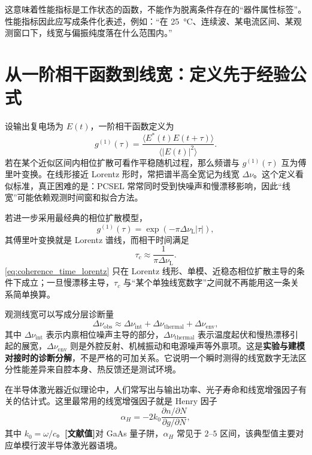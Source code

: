 这意味着性能指标是工作状态的函数，不能作为脱离条件存在的“器件属性标签”。性能指标因此应写成条件化表述，例如：“在 \SI{25}{\celsius}、连续波、某电流区间、某观测窗口下，线宽与偏振纯度落在什么范围内。”

\section{从一阶相干函数到线宽：定义先于经验公式}
设输出复电场为 $E(t)$，一阶相干函数定义为
\begin{equation}
 g^{(1)}(\tau)=\frac{\langle E^*(t)E(t+\tau)\rangle}{\langle |E(t)|^2\rangle}.
\end{equation}
若在某个近似区间内相位扩散可看作平稳随机过程，那么频谱与 $g^{(1)}(\tau)$ 互为傅里叶变换。在线形接近 Lorentz 形时，常把谱半高全宽记为线宽 $\Delta\nu$。这个定义看似标准，真正困难的是：PCSEL 常常同时受到快噪声和慢漂移影响，因此“线宽”可能依赖观测时间窗和拟合方法。

若进一步采用最经典的相位扩散模型，
\begin{equation}
g^{(1)}(\tau)=\exp(-\pi\Delta\nu_{\mathrm{L}}|\tau|),
\label{eq:g1_lorentz}
\end{equation}
其傅里叶变换就是 Lorentz 谱线，而相干时间满足
\begin{equation}
\tau_c \approx \frac{1}{\pi\Delta\nu_{\mathrm{L}}}.
\label{eq:coherence_time_lorentz}
\end{equation}
\cref{eq:coherence_time_lorentz} 只在 Lorentz 线形、单模、近稳态相位扩散主导的条件下成立；一旦慢漂移主导，$\tau_c$ 与“某个单独线宽数字”之间就不再能用这一条关系简单换算。

观测线宽可以写成分层诊断量
\begin{equation}
\Delta\nu_{\mathrm{obs}}
\approx
\Delta\nu_{\mathrm{int}}
+
\Delta\nu_{\mathrm{thermal}}
+
\Delta\nu_{\mathrm{env}},
\label{eq:linewidth_layers}
\end{equation}
其中 $\Delta\nu_{\mathrm{int}}$ 表示内禀相位噪声主导的部分，$\Delta\nu_{\mathrm{thermal}}$ 表示温度起伏和慢热漂移引起的展宽，$\Delta\nu_{\mathrm{env}}$ 则是外腔反射、机械振动和电源噪声等外禀项。这是\textbf{实验与建模对接时的诊断分解}，不是严格的可加关系。它说明一个瞬时测得的线宽数字无法区分性能差异来自腔本身、热反馈还是测试环境。

在半导体激光器近似理论中，人们常写出与输出功率、光子寿命和线宽增强因子有关的估计式。这里最常用的线宽增强因子就是 Henry 因子
\begin{equation}
\alpha_H = -2k_0\frac{\partial n/\partial N}{\partial g/\partial N},
\label{eq:henry_factor_metrics}
\end{equation}
其中 $k_0=\omega/c$。\textbf{[文献值]}对 GaAs 量子阱，$\alpha_H$ 常见于 $2$--$5$ 区间\cite{henry1982,coldren2012}，该典型值主要对应单模行波半导体激光器语境。

